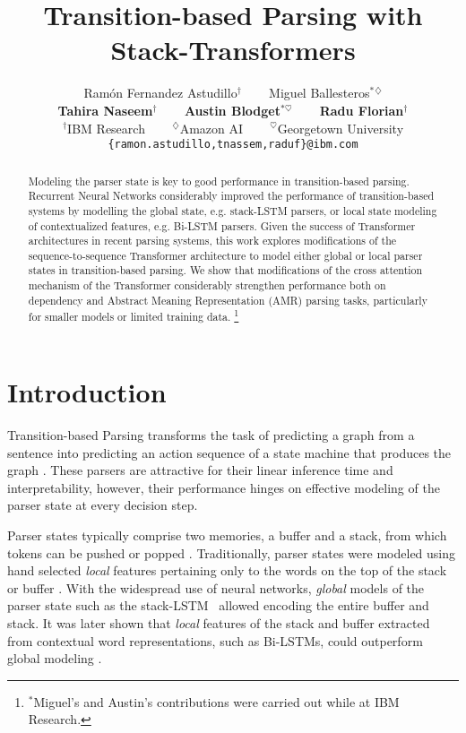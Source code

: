 \documentclass[11pt,a4paper]{article}
\title{Transition-based Parsing with Stack-Transformers}
\author{Ram\'{o}n Fernandez Astudillo$^\dagger$ ~~~ Miguel Ballesteros$^*$$^\diamondsuit$ \\ \textbf{Tahira Naseem}$^\dagger$ ~~~ 
\textbf{Austin Blodget}$^{*\heartsuit}$ ~~~ \textbf{Radu Florian}$^\dagger$\\
$^\dagger$IBM Research ~~~ $^\diamondsuit$Amazon AI ~~~ 
$^\heartsuit$Georgetown University\\
\texttt{\footnotesize{\{ramon.astudillo,tnassem,raduf\}@ibm.com}}}
\date{}
\newcommand\blfootnote[1]{\begingroup
  \renewcommand\thefootnote{}\footnote{#1}\addtocounter{footnote}{-1}\endgroup
}
\begin{document}
\maketitle
\begin{abstract}
Modeling the parser state is key to good performance in transition-based parsing. Recurrent Neural Networks considerably improved the performance of transition-based systems by modelling the global state, e.g. stack-LSTM parsers, or local state modeling of contextualized features, e.g. Bi-LSTM parsers. Given the success of Transformer architectures in recent parsing systems, this work explores modifications of the sequence-to-sequence Transformer architecture to model either global or local parser states in transition-based parsing. We show that modifications of the cross attention mechanism of the Transformer considerably strengthen performance both on dependency and Abstract Meaning Representation (AMR) parsing tasks, particularly for smaller models or limited training data.\blfootnote{$^*$Miguel's and Austin's contributions were carried out while at IBM Research.}
\end{abstract}

\section{Introduction}
\label{section:intro}

Transition-based Parsing transforms the task of predicting a graph from a sentence into predicting an action sequence of a state machine that produces the graph \cite{nivre2003efficient,nivre2004incrementality,Kubler:2009:DP:1538443,Henderson:2013:MJP:2576217.2576223}. These parsers are attractive for their linear inference time and interpretability, however, their performance hinges on effective modeling of the parser state at every decision step. 

Parser states typically comprise two memories, a buffer and a stack, from which tokens can be pushed or popped \cite{Kubler:2009:DP:1538443}. Traditionally, parser states were modeled using hand selected \textit{local} features pertaining only to the words on the top of the stack or buffer \cite[inter-alia]{nivre2007maltparser,zhang-nivre-2011-transition}. With the widespread use of neural networks, \textit{global} models of the parser state such as the stack-LSTM~\cite{dyer2015transition} allowed encoding the entire buffer and stack. It was later shown that \textit{local} features of the stack and buffer extracted from contextual word representations, such as Bi-LSTMs, could outperform global modeling \cite{kiperwasser-goldberg-2016-simple,dozat2016deep}.
\end{document}
